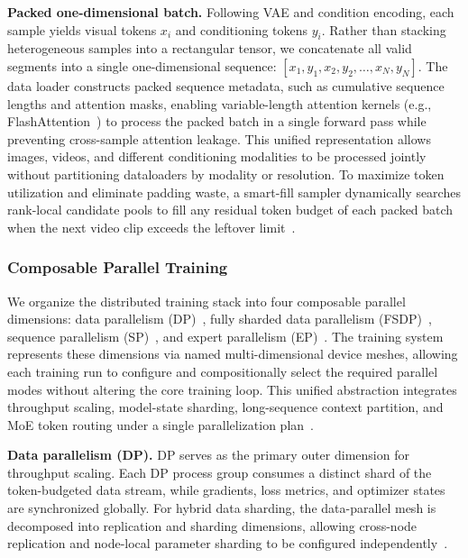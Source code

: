 \noindent\textbf{Packed one-dimensional batch.}
Following VAE and condition encoding, each sample yields visual tokens $x_i$ and conditioning tokens $y_i$.
Rather than stacking heterogeneous samples into a rectangular tensor, we concatenate all valid segments into a single one-dimensional sequence:
$[x_1, y_1, x_2, y_2, \ldots, x_N, y_N]$.
The data loader constructs packed sequence metadata, such as cumulative sequence lengths and attention masks, enabling variable-length attention kernels (e.g., FlashAttention~\cite{dao2022flashattention}) to process the packed batch in a single forward pass while preventing cross-sample attention leakage.
This unified representation allows images, videos, and different conditioning modalities to be processed jointly without partitioning dataloaders by modality or resolution.
To maximize token utilization and eliminate padding waste, a smart-fill sampler dynamically searches rank-local candidate pools to fill any residual token budget of each packed batch when the next video clip exceeds the leftover limit~\cite{krell2021efficientsequencepacking}.

\subsubsection{Composable Parallel Training}
We organize the distributed training stack into four composable parallel dimensions: data parallelism (DP)~\cite{li2020pytorchdistributed,shoeybi2019megatronlm}, fully sharded data parallelism (FSDP)~\cite{rajbhandari2020zero,zhao2023pytorchfsdp}, sequence parallelism (SP)~\cite{jacobs2023deepspeed}, and expert parallelism (EP)~\cite{shazeer2017moe,lepikhin2020gshard,rajbhandari2022deepspeedmoe,hwang2022tutel}.
The training system represents these dimensions via named multi-dimensional device meshes, allowing each training run to configure and compositionally select the required parallel modes without altering the core training loop.
This unified abstraction integrates throughput scaling, model-state sharding, long-sequence context partition, and MoE token routing under a single parallelization plan~\cite{shazeer2018mesh,xu2021gspmd,zheng2022alpa,narayanan2021efficient,liang2025torchtitan,ma2025veomni}.

\noindent\textbf{Data parallelism (DP).}
DP serves as the primary outer dimension for throughput scaling.
Each DP process group consumes a distinct shard of the token-budgeted data stream, while gradients, loss metrics, and optimizer states are synchronized globally.
For hybrid data sharding, the data-parallel mesh is decomposed into replication and sharding dimensions, allowing cross-node replication and node-local parameter sharding to be configured independently~\cite{li2020pytorchdistributed,shoeybi2019megatronlm,rajbhandari2020zero}.

